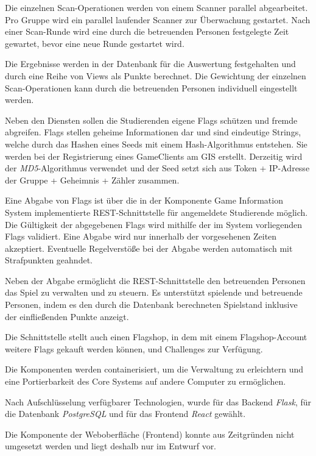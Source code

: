 Die einzelnen Scan-Operationen werden von einem Scanner parallel abgearbeitet. Pro Gruppe wird ein parallel laufender Scanner zur Überwachung gestartet. Nach einer Scan-Runde wird eine durch die betreuenden Personen festgelegte Zeit gewartet, bevor eine neue Runde gestartet wird.

Die Ergebnisse werden in der Datenbank für die Auswertung festgehalten und durch eine Reihe von Views als Punkte berechnet. Die Gewichtung der einzelnen Scan-Operationen kann durch die betreuenden Personen individuell eingestellt werden.

Neben den Diensten sollen die Studierenden eigene Flags schützen und fremde abgreifen.
Flags stellen geheime Informationen dar und sind eindeutige Strings, welche durch das Hashen eines Seeds mit einem Hash-Algorithmus entstehen. Sie werden bei der Registrierung eines GameClients am GIS erstellt.
Derzeitig wird der \textit{MD5}-Algorithmus verwendet und der Seed setzt sich aus Token + IP-Adresse der Gruppe + Geheimnis + Zähler zusammen.

Eine Abgabe von Flags ist über die in der Komponente Game Information System implementierte REST-Schnittstelle für angemeldete Studierende möglich. Die Gültigkeit der abgegebenen Flags wird mithilfe der im System vorliegenden Flags validiert. Eine Abgabe wird nur innerhalb der vorgesehenen Zeiten akzeptiert. Eventuelle Regelverstöße bei der Abgabe werden automatisch mit Strafpunkten geahndet.

Neben der Abgabe ermöglicht die REST-Schnittstelle den betreuenden Personen das Spiel zu verwalten und zu steuern. Es unterstützt spielende und betreuende Personen, indem es den durch die Datenbank berechneten Spielstand inklusive der einfließenden Punkte anzeigt.

Die Schnittstelle stellt auch einen Flagshop, in dem mit einem Flagshop-Account weitere Flags gekauft werden können, und Challenges zur Verfügung.

Die Komponenten werden containerisiert, um die Verwaltung zu erleichtern und eine Portierbarkeit des Core Systems auf andere Computer zu ermöglichen.

Nach Aufschlüsselung verfügbarer Technologien, wurde für das Backend \textit{Flask}, für die Datenbank \textit{PostgreSQL} und für das Frontend \textit{React} gewählt.

Die Komponente der Weboberfläche (Frontend) konnte aus Zeitgründen nicht umgesetzt werden und liegt deshalb nur im Entwurf vor.




